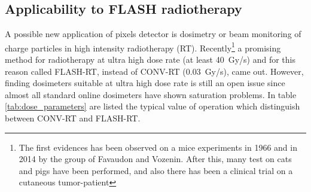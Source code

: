     \subsection{Applicability to FLASH radiotherapy}
        A possible new application of pixels detector is dosimetry or beam monitoring of charge particles in high intensity radiotherapy (RT).
        Recently\footnote{The first evidences has been observed on a mice experiments in 1966 and in 2014 by the group of Favaudon and Vozenin. After this, many test on cats and pigs have been performed, and also there has been a clinical trial on a cutaneous tumor-patient} a promising method for radiotherapy at ultra high dose rate (at least \SI{40}{Gy/s}) and for this reason called FLASH-RT\cite{FLASH_review}, instead of CONV-RT (\SI{0.03}{Gy/s}), came out. However, finding dosimeters suitable at ultra high dose rate is still an open issue since almost all standard online dosimeters have shown saturation problems. In table \ref{tab:dose_parameters} are listed the typical value of operation which distinguish  between CONV-RT and FLASH-RT.


